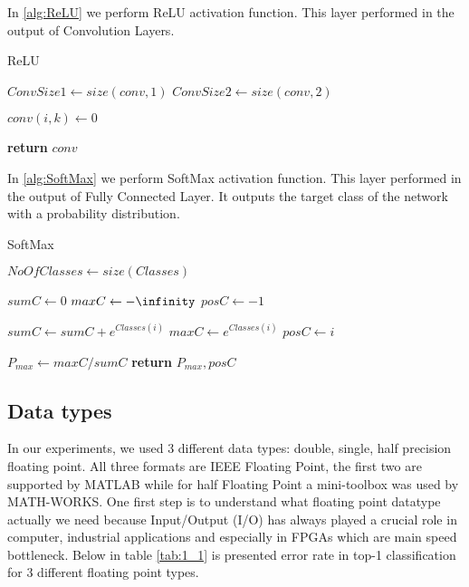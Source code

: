 In \ref{alg:ReLU} we perform ReLU activation function. This layer performed in the output of Convolution Layers.

\begin{algorithm}[H]
\caption{ReLU}\label{alg:ReLU}
\begin{algorithmic}[1]
\State $ConvSize1\gets size(conv,1)$ 
\State $ConvSize2\gets size(conv,2)$ 


\State $conv(i,k)\gets 0$
\EndIf
\EndFor 
\EndFor 

\State \textbf{return} $conv$       
\EndProcedure
\end{algorithmic}
\end{algorithm}


In \ref{alg:SoftMax} we perform SoftMax activation function. This layer performed in the output of Fully Connected Layer. It outputs the target class of the network with a probability distribution.

\begin{algorithm}[H]
\caption{SoftMax}\label{alg:SoftMax}
\begin{algorithmic}[1]
\State $NoOfClasses\gets size(Classes)$ 

\State $sumC\gets 0$
\State $maxC\gets -\infinity$
\State $posC\gets -1$

\State $sumC\gets sumC + e^{Classes(i)}$
\State $maxC\gets e^{Classes(i)}$
\State $posC\gets i$ 
\EndIf
\EndFor 

\State $P_{max} \gets maxC/sumC$ 
\State \textbf{return} $P_{max},posC$       
\EndProcedure
\end{algorithmic}
\end{algorithm}

\subsection{Data types}

In our experiments, we used 3 different data types: double, single, half precision floating point. All three formats are IEEE Floating Point, the first two are supported by MATLAB while for half Floating Point a mini-toolbox was used by MATH-WORKS. One first step is to understand what floating point datatype actually we need because Input/Output (I/O) has always played a crucial role in computer, industrial applications and especially in FPGAs which are main speed bottleneck. Below in table \ref{tab:1_1} is presented error rate in top-1 classification for 3 different floating point types.


